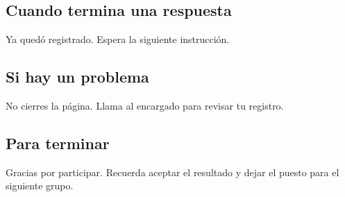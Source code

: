 \documentclass[12pt,a4paper]{article}
\newcommand{\subtitulo}[1]{\subsection*{#1}}
\begin{document}
\subtitulo{Cuando termina una respuesta}
\begin{tcolorbox}[colback=gris,colframe=verde]
Ya quedó registrado. Espera la siguiente instrucción.
\end{tcolorbox}

\subtitulo{Si hay un problema}
\begin{tcolorbox}[colback=gris,colframe=rosado]
No cierres la página. Llama al encargado para revisar tu registro.
\end{tcolorbox}

\subtitulo{Para terminar}
\begin{tcolorbox}[colback=gris,colframe=azul]
Gracias por participar. Recuerda aceptar el resultado y dejar el puesto para el siguiente grupo.
\end{tcolorbox}
\end{document}
